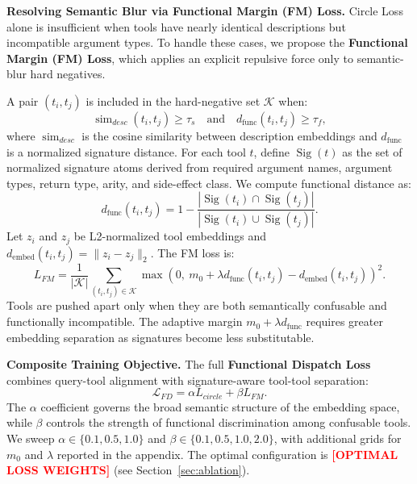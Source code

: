 \documentclass{article}
\newcommand{\placeholder}[1]{\textcolor{red}{\textbf{[#1]}}}
\begin{document}
\textbf{Resolving Semantic Blur via Functional Margin (FM) Loss.}
Circle Loss alone is insufficient when tools have nearly identical descriptions but incompatible argument types.
To handle these cases, we propose the \textbf{Functional Margin (FM) Loss}, which applies an explicit repulsive force only to semantic-blur hard negatives.

A pair $(t_i, t_j)$ is included in the hard-negative set $\mathcal{K}$ when:
\begin{equation}
    \operatorname{sim}_{desc}(t_i,t_j) \geq \tau_s
    \quad \text{and} \quad
    d_{\text{func}}(t_i,t_j) \geq \tau_f,
\end{equation}
where $\operatorname{sim}_{desc}$ is the cosine similarity between description embeddings and $d_{\text{func}}$ is a normalized signature distance.
For each tool $t$, define $\operatorname{Sig}(t)$ as the set of normalized signature atoms derived from required argument names, argument types, return type, arity, and side-effect class.
We compute functional distance as:
\begin{equation}
    d_{\text{func}}(t_i,t_j) =
    1 -
    \frac{|\operatorname{Sig}(t_i) \cap \operatorname{Sig}(t_j)|}
    {|\operatorname{Sig}(t_i) \cup \operatorname{Sig}(t_j)|}.
\end{equation}
Let $z_i$ and $z_j$ be L2-normalized tool embeddings and $d_{\text{embed}}(t_i,t_j)=\|z_i-z_j\|_2$.
The FM loss is:
\begin{equation}
    L_{FM} =
    \frac{1}{|\mathcal{K}|}
    \sum_{(t_i,t_j) \in \mathcal{K}}
    \max\!\left(0,\ m_0 + \lambda d_{\text{func}}(t_i,t_j) - d_{\text{embed}}(t_i,t_j)\right)^2.
\end{equation}
Tools are pushed apart only when they are both semantically confusable and functionally incompatible.
The adaptive margin $m_0 + \lambda d_{\text{func}}$ requires greater embedding separation as signatures become less substitutable.

\textbf{Composite Training Objective.}
The full \textbf{Functional Dispatch Loss} combines query-tool alignment with signature-aware tool-tool separation:
\begin{equation}
    \mathcal{L}_{FD} = \alpha L_{circle} + \beta L_{FM}.
\end{equation}
The $\alpha$ coefficient governs the broad semantic structure of the embedding space, while $\beta$ controls the strength of functional discrimination among confusable tools.
We sweep $\alpha \in \{0.1, 0.5, 1.0\}$ and $\beta \in \{0.1, 0.5, 1.0, 2.0\}$, with additional grids for $m_0$ and $\lambda$ reported in the appendix.
The optimal configuration is \placeholder{OPTIMAL LOSS WEIGHTS} (see Section~\ref{sec:ablation}).
\end{document}
